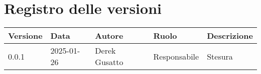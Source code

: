 \section*{Registro delle versioni}

\begin{tabular}{|C{1.7cm}|C{2cm}|C{3.5cm}|C{2.9cm}|L{3.6cm}|}
    \hline
    \textbf{Versione} & \textbf{Data} & \textbf{Autore} & \textbf{Ruolo} & \textbf{Descrizione} \\
        \hline
        0.0.1 & 2025-01-26 & Derek Gusatto & Responsabile  & Stesura \\
        \hline
\end{tabular}
